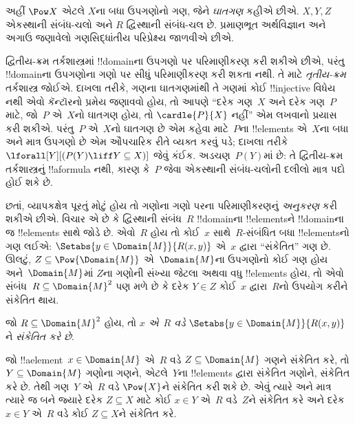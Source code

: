 \documentclass[../../../include/open-logic-section]{subfiles}
\begin{document}


અહીં $\Pow X$ એટલે $X$ના બધા ઉપગણોનો ગણ, જેને \emph{ઘાતગણ}
કહીએ છીએ. $X,Y,Z$ એકસ્થાની સંબંધ-ચલો અને $R$ દ્વિસ્થાની
સંબંધ-ચલ છે. પ્રમાણભૂત અર્થવિજ્ઞાન અને અગાઉ જણાવેલો
ગણસિદ્ધાંતીય પરિપ્રેક્ષ્ય જાળવીએ છીએ.

\begin{explain}
દ્વિતીય-ક્રમ તર્કશાસ્ત્રમાં !!{domain}ના ઉપગણો પર પરિમાણીકરણ કરી
શકીએ છીએ, પરંતુ !!{domain}ના ઉપગણોના ગણો પર સીધું પરિમાણીકરણ કરી
શકતા નથી. તે માટે \emph{તૃતીય-ક્રમ} તર્કશાસ્ત્ર જોઈએ. દાખલા તરીકે,
ગણના ઘાતગણમાંથી તે ગણમાં કોઈ !!{injective} વિધેય નથી એવો
કૅન્ટૉરનો પ્રમેય જણાવવો હોય, તો આપણે ``દરેક ગણ~$X$ અને દરેક
ગણ~$P$ માટે, જો~$P$ એ~$X$નો ઘાતગણ હોય, તો
$\cardle{P}{X}$ નહીં'' એમ લખવાનો પ્રયાસ કરી શકીએ. પરંતુ~$P$
એ~$X$નો ઘાતગણ છે એમ કહેવા માટે~$P$ના !!{element}s એ~$X$ના
બધા અને માત્ર ઉપગણો છે એમ ઔપચારિક રીતે વ્યક્ત કરવું પડે; દાખલા
તરીકે $\lforall[Y][(P(Y) \liff Y \subseteq X)]$ જેવું કંઈક.
અડચણ~$P(Y)$માં છે: તે દ્વિતીય-ક્રમ તર્કશાસ્ત્રનું !!a{formula}
નથી, કારણ કે~$P$ જેવા એકસ્થાની સંબંધ-ચલોની દલીલો માત્ર પદો હોઈ
શકે છે.

છતાં, વ્યાપકક્ષેત્ર પૂરતું મોટું હોય તો ગણોના ગણો પરના પરિમાણીકરણનું
\emph{અનુકરણ} કરી શકીએ છીએ. વિચાર એ છે કે દ્વિસ્થાની સંબંધ~$R$
!!{domain}ના !!{element}sને !!{domain}ના જ !!{element}s સાથે જોડે છે.
એવો~$R$ હોય તો કોઈ~$x$ સાથે~$R$-સંબંધિત બધા !!{element}sનો ગણ લઈએ:
$\Setabs{y \in \Domain{M}}{R(x,y)}$ એ~$x$ દ્વારા
``સંકેતિત'' ગણ છે. ઊલટું, $Z \subseteq \Pow{\Domain{M}}$
એ~$\Domain{M}$ના ઉપગણોનો કોઈ ગણ હોય અને~$\Domain{M}$માં
$Z$ના ગણોની સંખ્યા જેટલા અથવા વધુ !!{element}s હોય, તો એવો
સંબંધ~$R \subseteq \Domain{M}^2$ પણ મળે છે કે દરેક $Y \in Z$
કોઈ~$x$ દ્વારા~$R$નો ઉપયોગ કરીને સંકેતિત થાય.
\end{explain}

\begin{defn}
જો $R \subseteq \Domain{M}^2$ હોય, તો \emph{$x$ એ~$R$ વડે}
$\Setabs{y \in \Domain{M}}{R(x, y)}$ને \emph{સંકેતિત કરે છે}.
\end{defn}

જો !!a{element}~$x \in \Domain{M}$ એ~$R$ વડે
$Z \subseteq \Domain{M}$ ગણને સંકેતિત કરે, તો
$Y \subseteq \Domain{M}$ ગણોના ગણને, એટલે~$Y$ના !!{element}s
દ્વારા સંકેતિત ગણોને, સંકેતિત કરે છે. તેથી ગણ~$Y$ એ~$R$ વડે
$\Pow{X}$ને સંકેતિત કરી શકે છે. એવું ત્યારે અને માત્ર ત્યારે જ બને
જ્યારે દરેક $Z \subseteq X$ માટે કોઈ $x \in Y$ એ~$R$ વડે~$Z$ને
સંકેતિત કરે અને દરેક $x \in Y$ એ~$R$ વડે કોઈ $Z \subseteq X$ને
સંકેતિત કરે.
\end{document}
